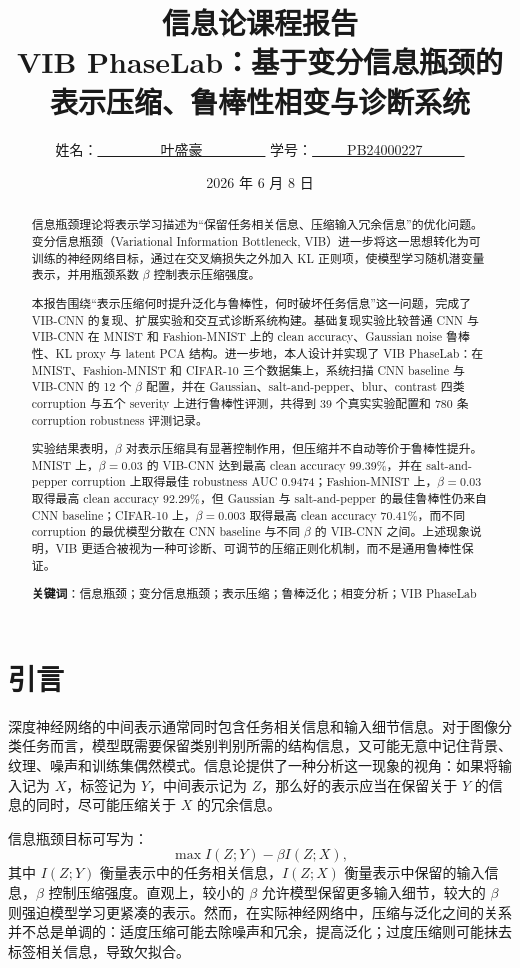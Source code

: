 \documentclass[11pt,a4paper]{article}
\title{\bf 信息论课程报告\\[0.5em]
\Large VIB PhaseLab：基于变分信息瓶颈的表示压缩、鲁棒性相变与诊断系统}
\author{姓名：\underline{~~~~~~~~~叶盛豪~~~~~~~~~} \quad 学号：\underline{~~~~~PB24000227~~~~~~}}
\date{2026 年 6 月 8 日}
\begin{document}
\maketitle

\begin{abstract}
信息瓶颈理论将表示学习描述为“保留任务相关信息、压缩输入冗余信息”的优化问题。变分信息瓶颈（Variational Information Bottleneck, VIB）进一步将这一思想转化为可训练的神经网络目标，通过在交叉熵损失之外加入 KL 正则项，使模型学习随机潜变量表示，并用瓶颈系数 $\beta$ 控制表示压缩强度。

本报告围绕“表示压缩何时提升泛化与鲁棒性，何时破坏任务信息”这一问题，完成了 VIB-CNN 的复现、扩展实验和交互式诊断系统构建。基础复现实验比较普通 CNN 与 VIB-CNN 在 MNIST 和 Fashion-MNIST 上的 clean accuracy、Gaussian noise 鲁棒性、KL proxy 与 latent PCA 结构。进一步地，本人设计并实现了 VIB PhaseLab：在 MNIST、Fashion-MNIST 和 CIFAR-10 三个数据集上，系统扫描 CNN baseline 与 VIB-CNN 的 12 个 $\beta$ 配置，并在 Gaussian、salt-and-pepper、blur、contrast 四类 corruption 与五个 severity 上进行鲁棒性评测，共得到 39 个真实实验配置和 780 条 corruption robustness 评测记录。

实验结果表明，$\beta$ 对表示压缩具有显著控制作用，但压缩并不自动等价于鲁棒性提升。MNIST 上，$\beta=0.03$ 的 VIB-CNN 达到最高 clean accuracy 99.39\%，并在 salt-and-pepper corruption 上取得最佳 robustness AUC 0.9474；Fashion-MNIST 上，$\beta=0.03$ 取得最高 clean accuracy 92.29\%，但 Gaussian 与 salt-and-pepper 的最佳鲁棒性仍来自 CNN baseline；CIFAR-10 上，$\beta=0.003$ 取得最高 clean accuracy 70.41\%，而不同 corruption 的最优模型分散在 CNN baseline 与不同 $\beta$ 的 VIB-CNN 之间。上述现象说明，VIB 更适合被视为一种可诊断、可调节的压缩正则化机制，而不是通用鲁棒性保证。

\noindent\textbf{关键词}：信息瓶颈；变分信息瓶颈；表示压缩；鲁棒泛化；相变分析；VIB PhaseLab
\end{abstract}

\section{引言}

深度神经网络的中间表示通常同时包含任务相关信息和输入细节信息。对于图像分类任务而言，模型既需要保留类别判别所需的结构信息，又可能无意中记住背景、纹理、噪声和训练集偶然模式。信息论提供了一种分析这一现象的视角：如果将输入记为 $X$，标签记为 $Y$，中间表示记为 $Z$，那么好的表示应当在保留关于 $Y$ 的信息的同时，尽可能压缩关于 $X$ 的冗余信息。

信息瓶颈目标可写为：
\begin{equation}
\max I(Z;Y)-\beta I(Z;X),
\end{equation}
其中 $I(Z;Y)$ 衡量表示中的任务相关信息，$I(Z;X)$ 衡量表示中保留的输入信息，$\beta$ 控制压缩强度。直观上，较小的 $\beta$ 允许模型保留更多输入细节，较大的 $\beta$ 则强迫模型学习更紧凑的表示。然而，在实际神经网络中，压缩与泛化之间的关系并不总是单调的：适度压缩可能去除噪声和冗余，提高泛化；过度压缩则可能抹去标签相关信息，导致欠拟合。
\end{document}
